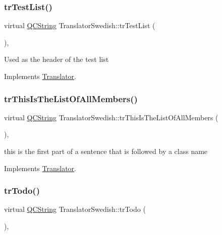 \subsubsection{\texorpdfstring{trTestList()}{trTestList()}}
{\footnotesize\ttfamily virtual \mbox{\hyperlink{class_q_c_string}{Q\+C\+String}} Translator\+Swedish\+::tr\+Test\+List (\begin{DoxyParamCaption}{ }\end{DoxyParamCaption})\hspace{0.3cm}{\ttfamily [inline]}, {\ttfamily [virtual]}}

Used as the header of the test list 

Implements \mbox{\hyperlink{class_translator}{Translator}}.

\mbox{\label{class_translator_swedish_a858bbc9d7b26c631107dfc29ba216d17}} 
\subsubsection{\texorpdfstring{trThisIsTheListOfAllMembers()}{trThisIsTheListOfAllMembers()}}
{\footnotesize\ttfamily virtual \mbox{\hyperlink{class_q_c_string}{Q\+C\+String}} Translator\+Swedish\+::tr\+This\+Is\+The\+List\+Of\+All\+Members (\begin{DoxyParamCaption}{ }\end{DoxyParamCaption})\hspace{0.3cm}{\ttfamily [inline]}, {\ttfamily [virtual]}}

this is the first part of a sentence that is followed by a class name 

Implements \mbox{\hyperlink{class_translator}{Translator}}.

\mbox{\label{class_translator_swedish_ad95487b9deac263764f466d42c1152b8}} 
\subsubsection{\texorpdfstring{trTodo()}{trTodo()}}
{\footnotesize\ttfamily virtual \mbox{\hyperlink{class_q_c_string}{Q\+C\+String}} Translator\+Swedish\+::tr\+Todo (\begin{DoxyParamCaption}{ }\end{DoxyParamCaption})\hspace{0.3cm}{\ttfamily [inline]}, {\ttfamily [virtual]}}

